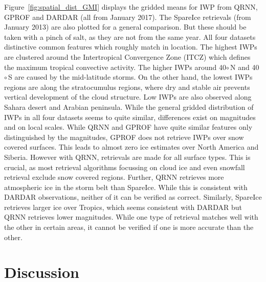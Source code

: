 \documentclass[amt, manuscript]{copernicus}
\begin{document}
Figure~\ref{fig:spatial_dist_GMI} displays the gridded means for IWP from QRNN, GPROF and DARDAR (all from January 2017). The SpareIce retrievals (from January 2013) are also plotted for a general comparison. But these should be taken with a pinch of salt, as they are not from the same year. All four datasets distinctive common features which roughly match in location. The highest IWPs are clustered around the Intertropical  Convergence Zone (ITCZ) which defines the maximum tropical convective activity. The higher IWPs around 40$\circ$\,N and 40$\circ$\,S are caused by the mid-latitude storms. On the other hand, the lowest IWPs regions are along the stratocumulus regions, where dry and stable air prevents vertical development of the cloud structure. Low IWPs are also observed along Sahara desert and Arabian peninsula. While the general gridded distribution of IWPs in all four datasets seems to quite similar, differences exist on magnitudes and on local scales. While QRNN and GPROF have quite similar features only distinguished by the magnitudes, GPROF does not retrieve IWPs over snow covered surfaces. This leads to almost zero ice estimates over North America and Siberia. However with QRNN, retrievals are made for all surface types. This is crucial, as most retrieval algorithms focussing on cloud ice and even snowfall retrieval \citep{rysman:slalom:18} exclude snow covered regions. Further, QRNN retrieves more atmospheric ice in the storm belt than SpareIce. While this is consistent with DARDAR observations, neither of it can be verified as correct. Similarly, SpareIce retrieves larger ice over Tropics, which seems consistent with DARDAR but QRNN retrieves lower magnitudes. While one type of retrieval matches well with the other in certain areas, it cannot be verified if one is more accurate than the other.  




\section{Discussion}
\end{document}
